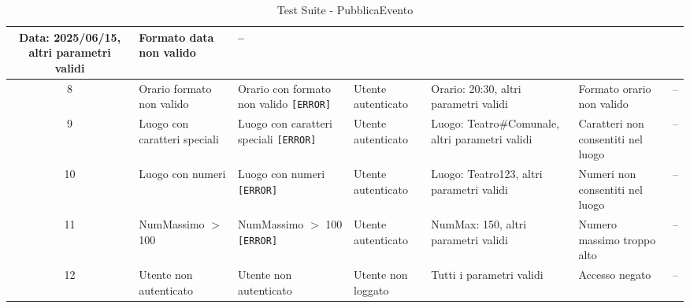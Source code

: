 \begin{table}[H]
\begin{tabular}{|c|p{2.5cm}|p{2.8cm}|p{1.5cm}|p{3.2cm}|p{2cm}|p{1.8cm}|}
		Data: 2025/06/15, altri parametri validi &
		Formato data non valido & -- \\
		\hline
		8 & Orario formato non valido & Orario con formato non valido \texttt{[ERROR]} & Utente autenticato &
		Orario: 20:30, altri parametri validi &
		Formato orario non valido & -- \\
		\hline
		9 & Luogo con caratteri speciali & Luogo con caratteri speciali \texttt{[ERROR]} & Utente autenticato &
		Luogo: Teatro\#Comunale, altri parametri validi &
		Caratteri non consentiti nel luogo & -- \\
		\hline
		10 & Luogo con numeri & Luogo con numeri \texttt{[ERROR]} & Utente autenticato &
		Luogo: Teatro123, altri parametri validi &
		Numeri non consentiti nel luogo & -- \\
		\hline
		11 & NumMassimo $>$ 100 & NumMassimo $>$ 100 \texttt{[ERROR]} & Utente autenticato &
		NumMax: 150, altri parametri validi &
		Numero massimo troppo alto & -- \\
		\hline
		12 & Utente non autenticato & Utente non autenticato & Utente non loggato &
		Tutti i parametri validi &
		Accesso negato & -- \\
		\hline
	\end{tabular}
	\caption{Test Suite - PubblicaEvento}
\end{table}